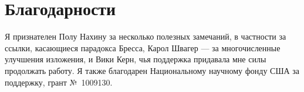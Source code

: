\chapter*{Благодарности}
{}

{\sloppy

Я признателен Полу Нахину за несколько полезных замечаний, в частности за ссылки, касающиеся парадокса Бресса,
Карол Швагер --- за многочисленные улучшения изложения,
и
Вики Керн, чья поддержка придавала мне силы продолжать работу.
Я также благодарен Национальному научному фонду США за поддержку, грант №~1009130.

}
